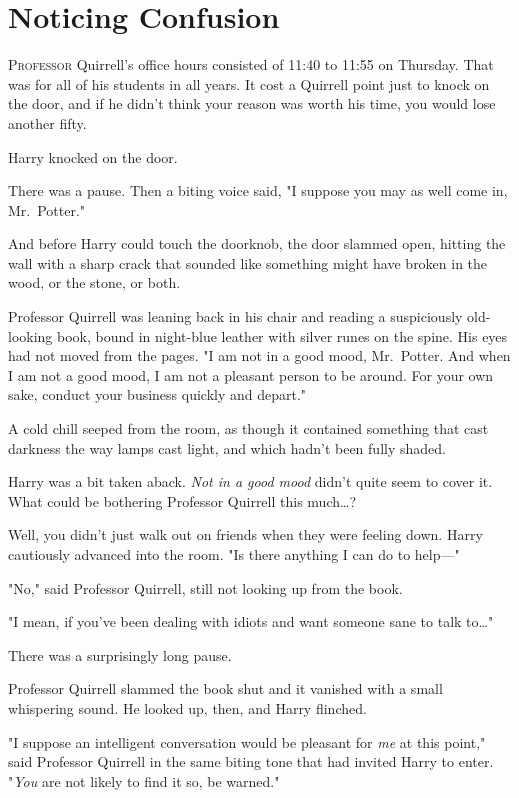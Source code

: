 \chapter{Noticing Confusion}

\label{ch-NoticingConfusion}

\lettrine{P}{rofessor} Quirrell's office hours consisted of 11:40 to 11:55 \AM on Thursday.
That was for all of his students in all years. It cost a Quirrell point just to
knock on the door, and if he didn't think your reason was worth his time, you
would lose another fifty.

Harry knocked on the door.

There was a pause. Then a biting voice said, "I suppose you may as well come
in, Mr.~Potter."

And before Harry could touch the doorknob, the door slammed open, hitting the
wall with a sharp crack that sounded like something might have broken in the
wood, or the stone, or both.

Professor Quirrell was leaning back in his chair and reading a suspiciously
old-looking book, bound in night-blue leather with silver runes on the spine.
His eyes had not moved from the pages. "I am not in a good mood, Mr.~Potter.
And when I am not a good mood, I am not a pleasant person to be around. For
your own sake, conduct your business quickly and depart."

A cold chill seeped from the room, as though it contained something that cast
darkness the way lamps cast light, and which hadn't been fully shaded.

Harry was a bit taken aback. \emph{Not in a good mood} didn't quite seem to
cover it. What could be bothering Professor Quirrell this much{\ldots}?

Well, you didn't just walk out on friends when they were feeling down. Harry
cautiously advanced into the room. "Is there anything I can do to help---"

"No," said Professor Quirrell, still not looking up from the book.

"I mean, if you've been dealing with idiots and want someone sane to talk
to{\ldots}"

There was a surprisingly long pause.

Professor Quirrell slammed the book shut and it vanished with a small
whispering sound. He looked up, then, and Harry flinched.

"I suppose an intelligent conversation would be pleasant for \emph{me} at this
point," said Professor Quirrell in the same biting tone that had invited Harry
to enter. "\emph{You} are not likely to find it so, be warned."


